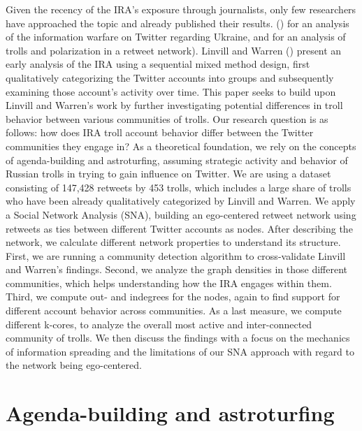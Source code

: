 \documentclass[12pt, titlepage=true, toc=bib]{scrartcl}
\begin{document}
Given the recency of the IRA's exposure through journalists, only few researchers have approached the topic and already published their results. (\cite[cf.][]{golovchenko_state_2018}) for an analysis of the information warfare on Twitter regarding Ukraine, and \textcite{stewart_examining_2018} for an analysis of trolls and polarization in a retweet network). Linvill and Warren (\cite*{linvill_troll_2018}) present an early analysis of the IRA using a sequential mixed method design, first qualitatively categorizing the Twitter accounts into groups and subsequently examining those account's activity over time. This paper seeks to build upon Linvill and Warren's work by further investigating potential differences in troll behavior between various communities of trolls. Our research question is as follows: how does IRA troll account behavior differ between the Twitter communities they engage in? As a theoretical foundation, we rely on the concepts of agenda-building and astroturfing, assuming strategic activity and behavior of Russian trolls in trying to gain influence on Twitter. We are using a dataset consisting of 147,428 retweets by 453 trolls, which includes a large share of trolls who have been already qualitatively categorized by Linvill and Warren. We apply a Social Network Analysis (SNA), building an ego-centered retweet network using retweets as ties between different Twitter accounts as nodes. After describing the network, we calculate different network properties to understand its structure. First, we are running a community detection algorithm to cross-validate Linvill and Warren's findings. Second, we analyze the graph densities in those different communities, which helps understanding how the IRA engages within them. Third, we compute out- and indegrees for the nodes, again to find support for different account behavior across communities. As a last measure, we compute different k-cores, to analyze the overall most active and inter-connected community of trolls. We then discuss the findings with a focus on the mechanics of information spreading and the limitations of our SNA approach with regard to the network being ego-centered.


\section{Agenda-building and astroturfing}
\end{document}
